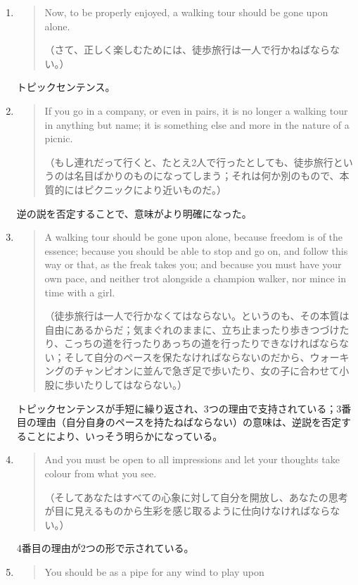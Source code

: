 \begin{enumerate}
    \item 
    \begin{quote}
    Now, to be properly enjoyed, a walking tour should be gone upon alone.
        
        （さて、正しく楽しむためには、徒歩旅行は一人で行かねばならない。）
    \end{quote}
    トピックセンテンス。
    \item 
    \begin{quote}
    If you go in a company, or even in pairs, it is no longer a
walking tour in anything but name; it is something else and more in the
nature of a picnic.

（もし連れだって行くと、たとえ2人で行ったとしても、徒歩旅行というのは名目ばかりのものになってしまう；それは何か別のもので、本質的にはピクニックにより近いものだ。）
    \end{quote}
    逆の説を否定することで、意味がより明確になった。
     \item 
     \begin{quote}
         A walking tour should be gone upon alone, because freedom is of
the essence; because you should be able to stop and go on, and follow
this way or that, as the freak takes you; and because you must have your
own pace, and neither trot alongside a champion walker, nor mince in
time with a girl.

（徒歩旅行は一人で行かなくてはならない。というのも、その本質は自由にあるからだ；気まぐれのままに、立ち止まったり歩きつづけたり、こっちの道を行ったりあっちの道を行ったりできなければならない；そして自分のペースを保たなければならないのだから、ウォーキングのチャンピオンに並んで急ぎ足で歩いたり、女の子に合わせて小股に歩いたりしてはならない。）
     \end{quote}
     トピックセンテンスが手短に繰り返され、3つの理由で支持されている；3番目の理由（自分自身のペースを持たねばならない）の意味は、逆説を否定することにより、いっそう明らかになっている。
     \item 
     \begin{quote}
         And you must be open to all impressions and let your thoughts
take colour from what you see.

（そしてあなたはすべての心象に対して自分を開放し、あなたの思考が目に見えるものから生彩を感じ取るように仕向けなければならない。）
     \end{quote}
     4番目の理由が2つの形で示されている。
     \item 
     \begin{quote}
         You should be as a pipe for any wind to play upon
         

\end{quote}
\end{enumerate}
